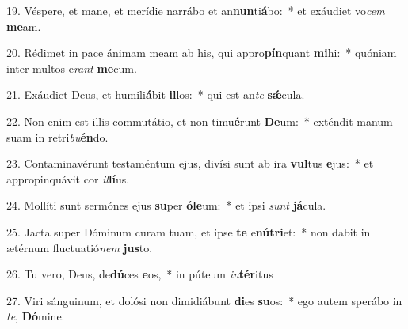 19. Véspere, et mane, et merídie narrábo et an\textbf{nun}ti\textbf{á}bo:~*  et exáudiet vo\textit{cem} \textbf{me}am.\

20. Rédimet in pace ánimam meam ab his, qui appro\textbf{pín}quant \textbf{mi}hi:~*  quóniam inter multos e\textit{rant} \textbf{me}cum.\

21. Exáudiet Deus, et humili\textbf{á}bit \textbf{il}los:~*  qui est an\textit{te} \textbf{sǽ}cula.\

22. Non enim est illis commutátio, et non timu\textbf{é}runt \textbf{De}um:~*  exténdit manum suam in retri\textit{bu}\textbf{én}do.\

23. Contaminavérunt testaméntum ejus, divísi sunt ab ira \textbf{vul}tus \textbf{e}jus:~*  et appropinquávit cor \textit{il}\textbf{lí}us.\

24. Mollíti sunt sermónes ejus \textbf{su}per \textbf{ó}\textbf{le}um:~*  et ipsi \textit{sunt} \textbf{já}cula.\

25. Jacta super Dóminum curam tuam, et ipse \textbf{te} e\textbf{nú}\textbf{tri}et:~*  non dabit in ætérnum fluctuatió\textit{nem} \textbf{jus}to.\

26. Tu vero, Deus, de\textbf{dú}ces \textbf{e}os,~*  in púteum \textit{in}\textbf{tér}itus\

27. Viri sánguinum, et dolósi non dimidiábunt \textbf{di}es \textbf{su}os:~*  ego autem sperábo in \textit{te}, \textbf{Dó}mine.\

